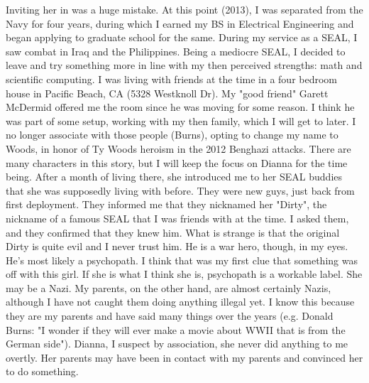 \documentclass[a4paper]{arthur-letter}
\begin{document}
\begin{letter}
            Inviting her in was a huge mistake. At this point (2013), I was separated from the Navy for four years, during which I earned my BS in Electrical Engineering and began applying to graduate school for the same. During my service as a SEAL, I saw combat in Iraq and the Philippines. Being a mediocre SEAL, I decided to leave and try something more in line with my then perceived strengths: math and scientific computing. I was living with friends at the time in a four bedroom house in Pacific Beach, CA (5328 Westknoll Dr). My "good friend" Garett McDermid offered me the room since he was moving for some reason. I think he was part of some setup, working with my then family, which I will get to later. I no longer associate with those people (Burns), opting to change my name to Woods, in honor of Ty Woods heroism in the 2012 Benghazi attacks. There are many characters in this story, but I will keep the focus on Dianna for the time being. After a month of living there, she introduced me to her SEAL buddies that she was supposedly living with before. They were new guys, just back from first deployment. They informed me that they nicknamed her "Dirty", the nickname of a famous SEAL that I was friends with at the time. I asked them, and they confirmed that they knew him. What is strange is that the original Dirty is quite evil and I never trust him. He is a war hero, though, in my eyes. He's most likely a psychopath. I think that was my first clue that something was off with this girl. If she is what I think she is, psychopath is a workable label. She may be a Nazi. My parents, on the other hand, are almost certainly Nazis, although I have not caught them doing anything illegal yet. I know this because they are my parents and have said many things over the years (e.g. Donald Burns: "I wonder if they will ever make a movie about WWII that is from the German side"). Dianna, I suspect by association, she never did anything to me overtly. Her parents may have been in contact with my parents and convinced her to do something. \\
            

\end{letter}
\end{document}
